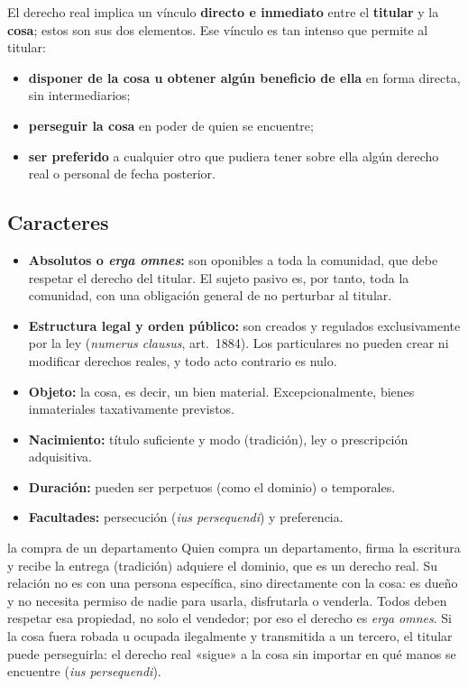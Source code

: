 \documentclass[12pt,oneside]{book}
\begin{document}
El derecho real implica un vínculo \textbf{directo e inmediato} entre el \textbf{titular} y la \textbf{cosa}; estos son sus dos elementos. Ese vínculo es tan intenso que permite al titular:

\begin{itemize}
    \item \textbf{disponer de la cosa u obtener algún beneficio de ella} en forma directa, sin intermediarios;
    \item \textbf{perseguir la cosa} en poder de quien se encuentre;
    \item \textbf{ser preferido} a cualquier otro que pudiera tener sobre ella algún derecho real o personal de fecha posterior.
\end{itemize}

\subsection{Caracteres}

\begin{itemize}
    \item \textbf{Absolutos o \textit{erga omnes}:} son oponibles a toda la comunidad, que debe respetar el derecho del titular. El sujeto pasivo es, por tanto, toda la comunidad, con una obligación general de no perturbar al titular.
    \item \textbf{Estructura legal y orden público:} son creados y regulados exclusivamente por la ley (\textit{numerus clausus}, art.~1884). Los particulares no pueden crear ni modificar derechos reales, y todo acto contrario es nulo.
    \item \textbf{Objeto:} la cosa, es decir, un bien material. Excepcionalmente, bienes inmateriales taxativamente previstos.
    \item \textbf{Nacimiento:} título suficiente y modo (tradición), ley o prescripción adquisitiva.
    \item \textbf{Duración:} pueden ser perpetuos (como el dominio) o temporales.
    \item \textbf{Facultades:} persecución (\textit{ius persequendi}) y preferencia.
\end{itemize}

\begin{ejemplo}{la compra de un departamento}
Quien compra un departamento, firma la escritura y recibe la entrega (tradición) adquiere el dominio, que es un derecho real. Su relación no es con una persona específica, sino directamente con la cosa: es dueño y no necesita permiso de nadie para usarla, disfrutarla o venderla. Todos deben respetar esa propiedad, no solo el vendedor; por eso el derecho es \textit{erga omnes}. Si la cosa fuera robada u ocupada ilegalmente y transmitida a un tercero, el titular puede perseguirla: el derecho real «sigue» a la cosa sin importar en qué manos se encuentre (\textit{ius persequendi}).
\end{ejemplo}
\end{document}

